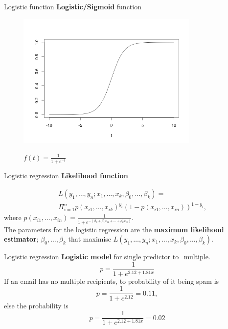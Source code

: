 \documentclass[12pt,a4paper]{beamer}
\begin{document}
					\begin{frame}{Logistic function}
						\textbf{Logistic/Sigmoid} function
						\begin{figure}
						\centering
						\begin{minipage}{0.8\textwidth}
						  \centering
						\includegraphics[width=0.8\textwidth]{figures/sigmoid}
					\end{minipage}%
					\begin{minipage}{0.2\textwidth}
						\small$f(t)=\frac{1}{1+e^{-t}}$
					\end{minipage}
						\end{figure}
						\end{frame}
						\begin{frame}{Logistic regression}
						\textbf{ Likelihood function}
						
	\small					\begin{eqnarray*}
						&&L(y_1,\dots,y_n;x_1,\dots,x_k,\beta_0,\dots,\beta_k)=\\&{}&\Pi^n_{i=1}p(x_{i1},\dots,x_{ik})^{y_i}(1-p(x_{i1},\dots,x_{in}))^{1-y_i},
						\end{eqnarray*}
		where $p(x_{i1},\dots,x_{in})=\frac{1}{1+e^{-(\beta_0+\beta_1x_{i1}+\dots+\beta_kx_{ik})}}.$\\
		\vspace{0.3cm}
		The parameters for the logistic regression are the \textbf{maximum likelihood estimator}; $\beta_0,\dots,\beta_k$ that maximise $L(y_1,\dots,y_n;x_1,\dots,x_k,\beta_0,\dots,\beta_k).$
						\end{frame}
						\begin{frame}{Logistic regression}
							\textbf{Logistic model} for single predictor to\_multiple.
							\[p=\frac{1}{1+e^{2.12+1.81x}}\]
							If an email has no multiple recipients, to probability of it being spam is
							\[p=\frac{1}{1+e^{2.12}}=0.11,\]
							else the probability is
							\[p=\frac{1}{1+e^{2.12+1.81x}}=0.02\]
						\end{frame}
\end{document}
